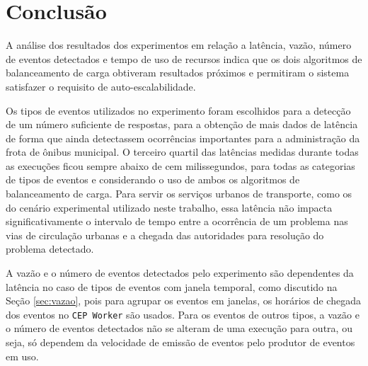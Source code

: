 






\section{Conclusão}


A análise dos resultados dos experimentos em relação a latência, vazão, número de eventos detectados e tempo de uso de recursos indica que os dois algoritmos de balanceamento de carga obtiveram resultados próximos e permitiram o sistema satisfazer o requisito de auto-escalabilidade. 

Os tipos de eventos utilizados no experimento foram escolhidos para a detecção de um número suficiente de respostas, para a obtenção de mais dados de latência de forma que ainda detectassem ocorrências importantes para a administração da frota de ônibus municipal. O terceiro quartil das latências medidas durante todas as execuções ficou sempre abaixo de cem milissegundos, para todas as categorias de tipos de eventos e considerando o uso de ambos os algoritmos de balanceamento de carga. Para servir os serviços urbanos de transporte, como os do cenário experimental utilizado neste trabalho, essa latência não impacta significativamente o intervalo de tempo entre a  ocorrência de um problema nas vias de circulação urbanas e a chegada das autoridades para resolução do problema detectado. 


A vazão e o número de eventos detectados pelo experimento são dependentes da latência no caso de tipos de eventos com janela temporal, como discutido na Seção \ref{sec:vazao}, pois para agrupar os eventos em janelas, os horários de chegada dos eventos no \texttt{CEP Worker} são usados. Para os eventos de outros tipos, a vazão e o número de eventos detectados não se alteram de uma execução para outra, ou seja, só dependem da velocidade de emissão de eventos pelo produtor de eventos em uso. 

